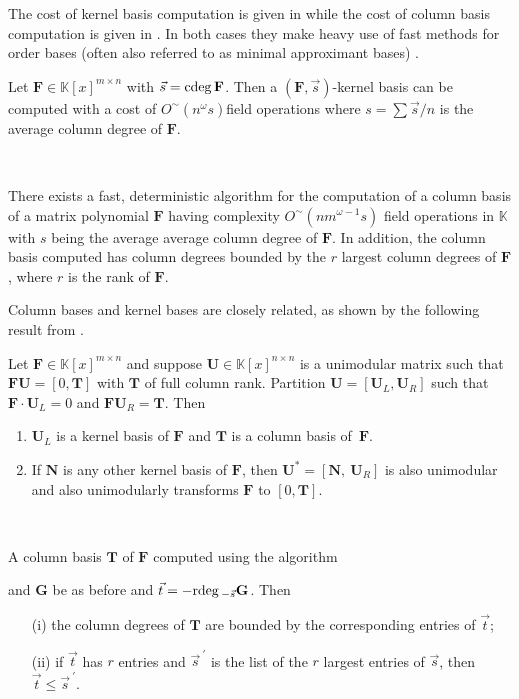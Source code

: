 The cost of kernel basis computation is given in \citep{za2012} while
the cost of column basis computation is given in \citep{za2013}.
In both cases they make heavy use of fast methods for order bases
(often also referred to as minimal approximant bases) \citep{BeLa94,Giorgi2003,ZL2012}.
\begin{thm}
\label{thm:costGeneral} Let $\mathbf{F}\in\mathbb{K}\left[x\right]^{m\times n}$
with $\vec{s}={\rm cdeg}\,\mathbf{F}$. Then a $\left(\mathbf{F},\vec{s}\right)$-kernel
basis can be computed with a cost of $O^{\sim}\left(n^{\omega}s\right)$field
operations where $s=\sum\vec{s}/n$ is the average column degree of
$\mathbf{F}$. 
\end{thm}
~
\begin{thm}
\label{thm:fastcolbasis} There exists a fast, deterministic algorithm
for the computation of a column basis of a matrix polynomial $\mathbf{F}$
having complexity $O^{\sim}\left(nm^{\omega-1}s\right)$ field operations
in $\mathbb{K}$ with $s$ being the average average column degree
of $\mathbf{F}$. In addition, the column basis computed has column
degrees bounded by the $r$ largest column degrees of $\mathbf{F}$,
where $r$ is the rank of $\mathbf{F}$.
\end{thm}
Column bases and kernel bases are closely related, as shown by the
following result from \citet{za2013,zhou:phd2012}.
\begin{lem}
\label{lem:unimodular_kernel_columnBasis} Let $\mathbf{F}\in\mathbb{K}\left[x\right]^{m\times n}$
and suppose $\mathbf{U}\in\mathbb{K}\left[x\right]^{n\times n}$ is
a unimodular matrix such that $\mathbf{F}\mathbf{U}=\left[0,\mathbf{T}\right]$
with $\mathbf{T}$ of full column rank. Partition $\mathbf{U}=\left[\mathbf{U}_{L},\mathbf{U}_{R}\right]$
such that $\mathbf{F}\cdot\mathbf{U}_{L}=0$ and $\mathbf{F}\mathbf{U}_{R}=\mathbf{T}$.
Then 
\begin{enumerate}
\item $\mathbf{U}_{L}$ is a kernel basis of $\mathbf{F}$ and $\mathbf{T}$
is a column basis of~$\mathbf{F}$. 
\item If $\mathbf{N}$ is any other kernel basis of $\mathbf{F}$, then
$\mathbf{U}^{*}=\left[\mathbf{N},~\mathbf{U}_{R}\right]$ is also
unimodular and also unimodularly transforms $\mathbf{F}$ to $\left[0,\mathbf{T}\right]$. 
\end{enumerate}
\end{lem}
~
\begin{lem}
\label{lem:colBasisdegreeBoundByRdegOfRightFactor}A column basis
$\mathbf{T}$ of $\mathbf{F}$ computed using the algorithm 

and $\mathbf{G}$ be as before and $\vec{t}=-{\rm rdeg}\,_{-\vec{s}}\mathbf{G}$.
Then 
\begin{itemize}
\item [(i)] the column degrees of $\mathbf{T}$ are bounded by the corresponding
entries of $\vec{t}$; 
\item [(ii)] if $\vec{t}$ has $r$ entries and $\vec{s}^{~\prime}$ is
the list of the $r$ largest entries of $\vec{s}$, then $\vec{t}\le\vec{s}^{~\prime}$. 
\end{itemize}
\end{lem}

